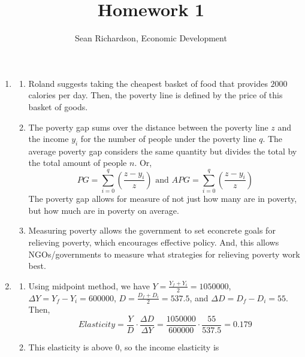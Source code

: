 \documentclass[12pt]{amsart}
\begin{document}
\title{Homework 1}
\author{Sean Richardson, Economic Development}
\maketitle

\begin{enumerate}
    \item \begin{enumerate}
            \item Roland suggests taking the cheapest basket
                of food that provides $2000$ calories per day. Then, the
                poverty line is defined by the price of this basket of
                goods.
            \item The poverty gap sums over the distance between the
                poverty line $z$ and the income $y_i$ for the number of
                people under the poverty line $q$. The average poverty gap
                considers the same quantity but divides the total by the
                total amount of people $n$. Or,
                \begin{equation*}
                PG = \sum_{i=0}^q \left( \frac{z-y_i}{z} \right)
                \text{  and  } 
                APG = \sum_{i=0}^q \left( \frac{z-y_i}{z} \right)
                \end{equation*}
                The poverty gap allows for measure of not just how many are
                in poverty, but how much are in poverty on average.
            \item Measuring poverty allows the government to set econcrete
                goals for relieving poverty, which encourages effective
                policy. And, this allows NGOs/governments to measure what
                strategies for relieving poverty work best.
        \end{enumerate}
    \item \begin{enumerate}
        \item 
            Using midpoint method, we have $Y = \frac{Y_f + Y_i}{2} =
             1050000$, $\Delta Y = Y_f-Y_i = 
            600000$, $D = \frac{D_f + D_i}{2} = 537.5$, and $\Delta D =
            D_f-D_i = 55$. Then,
            \begin{equation*}
                Elasticity = \frac{Y}{D} \cdot \frac{\Delta D}{\Delta Y} =
                \frac{1050000}{600000}\cdot\frac{55}{537.5} = 0.179
            \end{equation*}
        \item This elasticity is above $0$, so the income elasticity is

\end{enumerate}
\end{enumerate}
\end{document}
